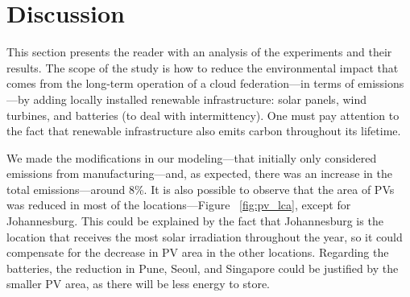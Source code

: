 




 




\section{Discussion}
\label{sec:long_term_discussion}

This section presents the reader with an analysis of the experiments and their results. The scope of the study is how to reduce the environmental impact that comes from the long-term operation of a cloud federation---in terms of  emissions---by adding locally installed renewable infrastructure: solar panels, wind turbines, and batteries (to deal with intermittency). One must pay attention to the fact that renewable infrastructure also emits carbon throughout its lifetime. 

We made the modifications in our modeling---that initially only considered emissions from manufacturing---and, as expected, there was an increase in the total emissions---around 8\%. It is also possible to observe that the area of PVs was reduced in most of the locations---Figure ~\ref{fig:pv_lca}, except for Johannesburg. This could be explained by the fact that Johannesburg is the location that receives the most solar irradiation throughout the year, so it could compensate for the decrease in PV area in the other locations. Regarding the batteries, the reduction in Pune, Seoul, and Singapore could be justified by the smaller PV area, as there will be less energy to store.

